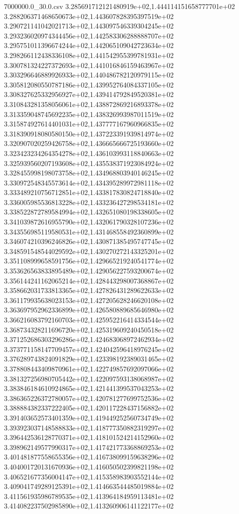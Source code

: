 \begin{filecontents*}{7000000.0_30.0.csv}
3.285691712121480919e+02,1.444114151658777701e+02
3.288206371468650673e+02,1.443607828395397519e+02
3.290721141042021713e+02,1.443097546339304245e+02
3.293236020974344456e+02,1.442583306288888707e+02
3.295751011396674244e+02,1.442065109042723634e+02
3.298266112438336108e+02,1.441542955399781931e+02
3.300781324227372693e+02,1.441016846159463967e+02
3.303296646889926933e+02,1.440486782120979115e+02
3.305812080550787186e+02,1.439952764084337105e+02
3.308327625332956927e+02,1.439414792849520381e+02
3.310843281358056061e+02,1.438872869216893378e+02
3.313359048745692235e+02,1.438326993987011519e+02
3.315874927614401031e+02,1.437777167960966835e+02
3.318390918080580150e+02,1.437223391939814974e+02
3.320907020259426758e+02,1.436665666725193660e+02
3.323423234264354278e+02,1.436103993118840663e+02
3.325939560207193608e+02,1.435538371923084924e+02
3.328455998198073758e+02,1.434968803940146245e+02
3.330972548345573614e+02,1.434395289972981118e+02
3.333489210756712851e+02,1.433817830824718840e+02
3.336005985536813228e+02,1.433236427298534181e+02
3.338522872789584994e+02,1.432651080198338605e+02
3.341039872616955790e+02,1.432061790328107236e+02
3.343556985119580531e+02,1.431468558492360899e+02
3.346074210396246826e+02,1.430871385495747745e+02
3.348591548544029592e+02,1.430270272143325201e+02
3.351108999658591756e+02,1.429665219240541774e+02
3.353626563833895489e+02,1.429056227593200674e+02
3.356144241162065214e+02,1.428443298007368867e+02
3.358662031733813365e+02,1.427826431289622633e+02
3.361179935638023153e+02,1.427205628246620108e+02
3.363697952962336899e+02,1.426580889685646980e+02
3.366216083792160703e+02,1.425952216414334544e+02
3.368734328211696720e+02,1.425319609240450518e+02
3.371252686303296286e+02,1.424683068972462934e+02
3.373771158147709457e+02,1.424042596418976245e+02
3.376289743824091829e+02,1.423398192389031465e+02
3.378808443409870961e+02,1.422749857692097066e+02
3.381327256980705442e+02,1.422097593138068987e+02
3.383846184610924865e+02,1.421441399537043253e+02
3.386365226372780057e+02,1.420781277699752536e+02
3.388884382337222405e+02,1.420117228437156882e+02
3.391403652573401359e+02,1.419449252560734749e+02
3.393923037148588833e+02,1.418777350882319297e+02
3.396442536128770371e+02,1.418101524214152960e+02
3.398962149577990317e+02,1.417421773368869253e+02
3.401481877558655356e+02,1.416738099159638296e+02
3.404001720131670936e+02,1.416050502399821198e+02
3.406521677356004147e+02,1.415358983903552144e+02
3.409041749289125391e+02,1.414663544485019884e+02
3.411561935986789535e+02,1.413964184959113481e+02
3.414082237502985890e+02,1.413260906141122177e+02

\end{filecontents*}
